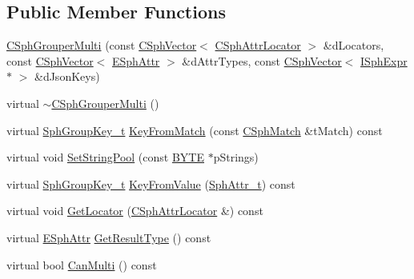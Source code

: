 \subsection*{Public Member Functions}
\begin{DoxyCompactItemize}
\item 
\hyperlink{classCSphGrouperMulti_afb733d78f504cc78c7160a421ac33a2c}{C\-Sph\-Grouper\-Multi} (const \hyperlink{classCSphVector}{C\-Sph\-Vector}$<$ \hyperlink{structCSphAttrLocator}{C\-Sph\-Attr\-Locator} $>$ \&d\-Locators, const \hyperlink{classCSphVector}{C\-Sph\-Vector}$<$ \hyperlink{sphinxexpr_8h_aa883df0db2e4468a107fdd2d2ae625a3}{E\-Sph\-Attr} $>$ \&d\-Attr\-Types, const \hyperlink{classCSphVector}{C\-Sph\-Vector}$<$ \hyperlink{structISphExpr}{I\-Sph\-Expr} $\ast$ $>$ \&d\-Json\-Keys)
\item 
virtual \hyperlink{classCSphGrouperMulti_ab0c0b5e816ed519966dfab7645b54475}{$\sim$\-C\-Sph\-Grouper\-Multi} ()
\item 
virtual \hyperlink{sphinxsort_8cpp_ab18dbc744a7e1518a776845191f194c8}{Sph\-Group\-Key\-\_\-t} \hyperlink{classCSphGrouperMulti_a04c6f9c23c7138027c1aa45416470106}{Key\-From\-Match} (const \hyperlink{classCSphMatch}{C\-Sph\-Match} \&t\-Match) const 
\item 
virtual void \hyperlink{classCSphGrouperMulti_ab0b6299428985ccf830e40d2887982f4}{Set\-String\-Pool} (const \hyperlink{sphinxstd_8h_a4ae1dab0fb4b072a66584546209e7d58}{B\-Y\-T\-E} $\ast$p\-Strings)
\item 
virtual \hyperlink{sphinxsort_8cpp_ab18dbc744a7e1518a776845191f194c8}{Sph\-Group\-Key\-\_\-t} \hyperlink{classCSphGrouperMulti_ac9866b13000e2c377b3970dbc07b9605}{Key\-From\-Value} (\hyperlink{sphinx_8h_a7c122d91b0b52a0214ba176636bb1561}{Sph\-Attr\-\_\-t}) const 
\item 
virtual void \hyperlink{classCSphGrouperMulti_ae4f7dd63fabdb15fcdca54f24ce9d550}{Get\-Locator} (\hyperlink{structCSphAttrLocator}{C\-Sph\-Attr\-Locator} \&) const 
\item 
virtual \hyperlink{sphinxexpr_8h_aa883df0db2e4468a107fdd2d2ae625a3}{E\-Sph\-Attr} \hyperlink{classCSphGrouperMulti_aef7e9d31d25e4d7009fab97c3eed6df5}{Get\-Result\-Type} () const 
\item 
virtual bool \hyperlink{classCSphGrouperMulti_a89bce57ca14897d6780634d2f59de2e8}{Can\-Multi} () const 
\end{DoxyCompactItemize}
